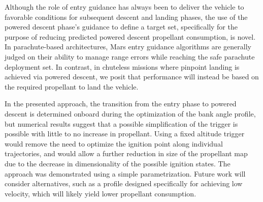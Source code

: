 \documentclass[letterpaper, paper,11pt]{AAS}
\begin{document}
Although the role of entry guidance has always been to deliver the vehicle to favorable conditions for subsequent descent and landing phases, the use of the powered descent phase's guidance to define a target set, specifically for the purpose of reducing predicted powered descent propellant consumption, is novel. In parachute-based architectures, Mars entry guidance algorithms are generally judged on their ability to manage range errors while reaching the safe parachute deployment set. In contrast, in chuteless missions where pinpoint landing is achieved via powered descent, we posit that performance will instead be based on the required propellant to land the vehicle.

In the presented approach, the transition from the entry phase to powered descent is determined onboard during the optimization of the bank angle profile, but numerical results suggest that a possible simplification of the trigger is possible with little to no increase in propellant. Using a fixed altitude trigger would remove the need to optimize the ignition point along individual trajectories, and would allow a further reduction in size of the propellant map due to the decrease in dimensionality of the possible ignition states. The approach was demonstrated using a simple parametrization. Future work will consider alternatives, such as a profile designed specifically for achieving low velocity, which will likely yield lower propellant consumption. 



\end{document}
